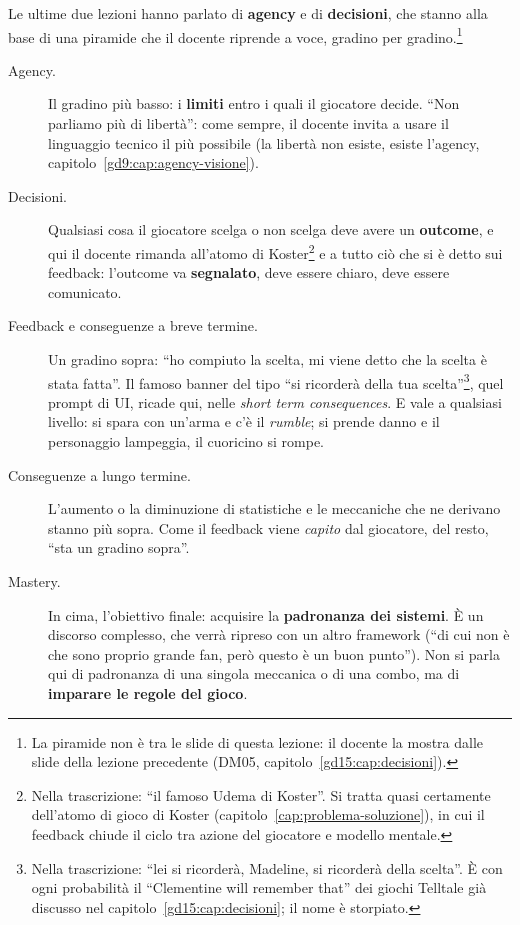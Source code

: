 Le ultime due lezioni hanno parlato di \textbf{agency} e di \textbf{decisioni}, che
stanno alla base di una piramide che il docente riprende a voce, gradino per
gradino.\footnote{La piramide non è tra le slide di questa lezione: il docente la
mostra dalle slide della lezione precedente (DM05, capitolo~\ref{gd15:cap:decisioni}).}
\begin{description}
  \item[Agency.] Il gradino più basso: i \textbf{limiti} entro i quali il giocatore
        decide. ``Non parliamo più di libertà'': come sempre, il docente invita a
        usare il linguaggio tecnico il più possibile (la libertà non esiste, esiste
        l'agency, capitolo~\ref{gd9:cap:agency-visione}).
  \item[Decisioni.] Qualsiasi cosa il giocatore scelga o non scelga deve avere un
        \textbf{outcome}, e qui il docente rimanda all'atomo di
        Koster\footnote{Nella trascrizione: ``il famoso Udema di Koster''. Si tratta
        quasi certamente dell'atomo di gioco di Koster
        (capitolo~\ref{cap:problema-soluzione}), in cui il feedback chiude il ciclo
        tra azione del giocatore e modello mentale.} e a tutto ciò che si è detto sui
        feedback: l'outcome va \textbf{segnalato}, deve essere chiaro, deve essere
        comunicato.
  \item[Feedback e conseguenze a breve termine.] Un gradino sopra: ``ho compiuto la
        scelta, mi viene detto che la scelta è stata fatta''. Il famoso banner del
        tipo ``si ricorderà della tua scelta''\footnote{Nella trascrizione: ``lei si
        ricorderà, Madeline, si ricorderà della scelta''. È con ogni probabilità il
        ``Clementine will remember that'' dei giochi Telltale già discusso nel
        capitolo~\ref{gd15:cap:decisioni}; il nome è storpiato.}, quel prompt di UI,
        ricade qui, nelle \emph{short term consequences}. E vale a qualsiasi livello:
        si spara con un'arma e c'è il \emph{rumble}; si prende danno e il personaggio
        lampeggia, il cuoricino si rompe.
  \item[Conseguenze a lungo termine.] L'aumento o la diminuzione di statistiche e le
        meccaniche che ne derivano stanno più sopra. Come il feedback viene
        \emph{capito} dal giocatore, del resto, ``sta un gradino sopra''.
  \item[Mastery.] In cima, l'obiettivo finale: acquisire la \textbf{padronanza dei
        sistemi}. È un discorso complesso, che verrà ripreso con un altro framework
        (``di cui non è che sono proprio grande fan, però questo è un buon punto'').
        Non si parla qui di padronanza di una singola meccanica o di una combo, ma
        di \textbf{imparare le regole del gioco}.
\end{description}

